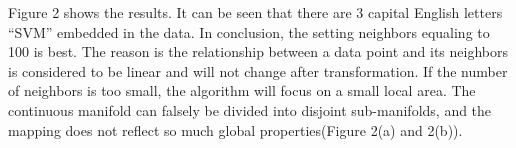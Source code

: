 \documentclass[22pt]{article}
\begin{document}
	Figure 2 shows the results. It can be seen that there are 3 capital English letters ``SVM'' embedded in the data. In conclusion, the setting neighbors equaling to 100 is best. The reason is the relationship between a data point and its neighbors is considered to be linear and will not change after transformation. If the number of neighbors is too small, the algorithm will focus on a small local area. The continuous manifold can falsely be divided into disjoint sub-manifolds, and the
	mapping does not reflect so much global properties(Figure 2(a) and 2(b)). 
	\begin{figure}[H]
				\centering
\end{figure}
\end{document}
